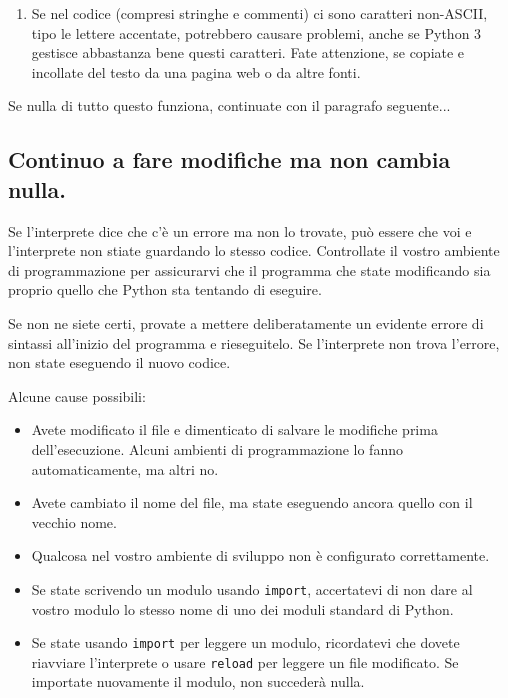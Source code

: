 \documentclass[10pt]{book}
\begin{document}
\begin{enumerate}
\item Se nel codice (compresi stringhe e commenti) ci sono caratteri non-ASCII, tipo le lettere accentate, potrebbero causare problemi, anche se Python 3 gestisce abbastanza bene questi caratteri. Fate attenzione, se copiate e incollate del testo da una pagina web o da altre fonti.

\end{enumerate}

Se nulla di tutto questo funziona, continuate con il paragrafo seguente...


\subsection{Continuo a fare modifiche ma non cambia nulla.}

Se l'interprete dice che c'è un errore ma non lo trovate, può essere che voi e l'interprete non stiate guardando lo stesso codice. Controllate il vostro ambiente di programmazione per assicurarvi che il programma che state modificando sia proprio quello che Python sta tentando di eseguire.

Se non ne siete certi, provate a mettere deliberatamente un evidente errore di sintassi all'inizio del programma e rieseguitelo. Se l'interprete non trova l'errore, non state eseguendo il nuovo codice.

Alcune cause possibili:

\begin{itemize}

\item Avete modificato il file e dimenticato di salvare le modifiche prima dell'esecuzione. Alcuni ambienti di programmazione lo fanno automaticamente, ma altri no.

\item Avete cambiato il nome del file, ma state eseguendo ancora quello con il vecchio nome.

\item Qualcosa nel vostro ambiente di sviluppo non è configurato correttamente.

\item Se state scrivendo un modulo usando {\tt import}, accertatevi di non dare al vostro modulo lo stesso nome di uno dei moduli standard di Python.

\item Se state usando {\tt import} per leggere un modulo, ricordatevi che dovete riavviare l'interprete o usare {\tt reload} per leggere un file modificato. Se importate nuovamente il modulo, non succederà nulla.

\end{itemize}
\end{document}
